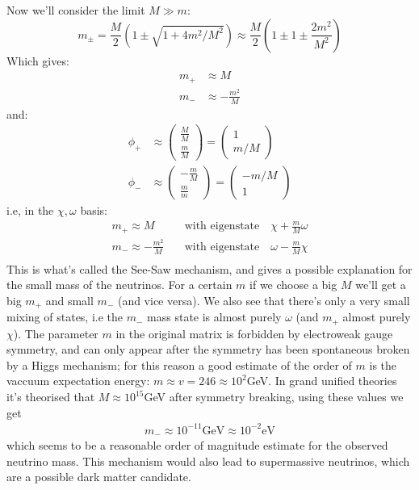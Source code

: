 \documentclass[11pt,a4paper,faculty=we,language=en,doctype=report]{cls/ugent-doc}
\begin{document}
Now we'll consider the limit $M \gg m$:
\begin{equation}
	m_\pm =  \frac{M}{2}\left( 1 \pm \sqrt{1 + 4m^2/M^2}\right) \approx \frac{M}{2}\left(1\pm1\pm\frac{2m^2}{M^2}\right)
\end{equation}
Which gives:
\begin{align}
	m_+ &\approx M\\
	m_- &\approx -\frac{m^2}{M}
\end{align}
and:
\begin{align}
	\phi_+&\approx \left(\begin{array}{c}
		\frac{M}{M}\\
		\frac{m}{M}
	\end{array}\right) = \left(\begin{array}{c}
	1\\
	m/M
	\end{array}\right)\\
	\phi_-&\approx \left(\begin{array}{c}
		-\frac{m}{M}\\
		\frac{m}{m}
	\end{array}\right) = \left(\begin{array}{c}
		-m/M\\
		1
	\end{array}\right)
\end{align}
i.e, in the $\chi,\omega$ basis:
\begin{align}
	m_+\approx M \quad &\text{with eigenstate} \quad \chi + \frac{m}{M}\omega\\
	m_-\approx -\frac{m^2}{M} \quad &\text{with eigenstate} \quad  \omega - \frac{m}{M}\chi\\
\end{align}
This is what's called the See-Saw mechanism, and gives a possible explanation for the
small mass of the neutrinos.  For a certain $m$ if we choose a big $M$ we'll
get a big $m_+$ and small $m_-$ (and vice versa). We also see that there's only
a very small mixing of states, i.e the $m_-$ mass state is almost purely
$\omega$ (and $m_+$ almost purely $\chi$). The parameter $m$ in the original
matrix is forbidden by electroweak gauge symmetry, and can only appear after
the symmetry has been spontaneous broken by a Higgs mechanism; for this reason
a good estimate of the order of $m$ is the vaccuum expectation energy:
$m\approx v = 246 \approx 10^2$GeV. In grand unified theories it's theorised
that $M\approx 10^{15}$GeV after symmetry breaking, using these values we get
\begin{align}
	m_- \approx 10^{-11}\text{GeV} \approx 10^{-2} \text{eV}
\end{align}
which seems \cite{neutrino-mass} to be a reasonable order of magnitude estimate for the observed neutrino
mass.
This mechanism would also lead to supermassive neutrinos, which are a possible dark matter
candidate.
\end{document}
